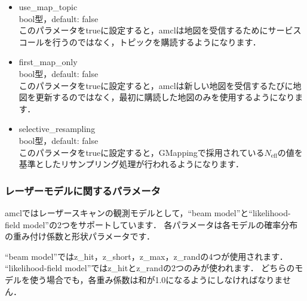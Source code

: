 \documentclass[{../../master}]{subfiles}
\begin{document}
\begin{itemize}
  \item \textsf{use\_map\_topic} \\
    bool型，default: \textsf{false} \\
    このパラメータを\textsf{true}に設定すると，\textsf{amcl}は地図を受信するためにサービスコールを行うのではなく，トピックを購読するようになります．
  \item \textsf{first\_map\_only} \\
    bool型，default: \textsf{false} \\
    このパラメータを\textsf{true}に設定すると，\textsf{amcl}は新しい地図を受信するたびに地図を更新するのではなく，最初に購読した地図のみを使用するようになります．
  \item \textsf{selective\_resampling} \\
    bool型，default: \textsf{false} \\
    このパラメータを\textsf{true}に設定すると，GMappingで採用されている$N_{\text{eff}}$の値を基準としたリサンプリング処理が行われるようになります．
\end{itemize}

\subsubsection{レーザーモデルに関するパラメータ}

\textsf{amcl}ではレーザースキャンの観測モデルとして，``beam model''と``likelihood-field model''の2つをサポートしています．
各パラメータは各モデルの確率分布の重み付け係数と形状パラメータです．

``beam model''では\textsf{z\_hit}，\textsf{z\_short}，\textsf{z\_max}，\textsf{z\_rand}の4つが使用されます．
``likelihood-field model''では\textsf{z\_hit}と\textsf{z\_rand}の2つのみが使われます．
どちらのモデルを使う場合でも，各重み係数は和が1.0になるようにしなければなりません．
\end{document}
